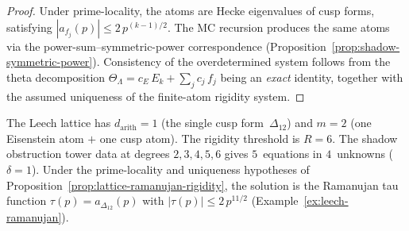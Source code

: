 \begin{proof}
Under prime-locality, the atoms are
Hecke eigenvalues of cusp forms, satisfying
$|a_{f_j}(p)| \leq 2\,p^{(k-1)/2}$. The MC recursion
produces the same atoms via the power-sum--symmetric-power
correspondence
(Proposition~\ref{prop:shadow-symmetric-power}). Consistency
of the overdetermined system follows from the theta decomposition
$\Theta_\Lambda = c_E\,E_k + \sum_j c_j\,f_j$ being an
\emph{exact} identity, together with the assumed uniqueness of the
finite-atom rigidity system.
\end{proof}

\begin{example}%
\label{ex:leech-rigidity}%
%
The Leech lattice has $d_{\mathrm{arith}} = 1$ (the single
cusp form~$\Delta_{12}$) and $m = 2$ (one Eisenstein atom $+$
one cusp atom). The rigidity threshold is $R = 6$. The
shadow obstruction tower data at degrees $2, 3, 4, 5, 6$ gives
$5$~equations in $4$~unknowns ($\delta = 1$). Under the
prime-locality and uniqueness hypotheses of
Proposition~\ref{prop:lattice-ramanujan-rigidity}, the solution is
the Ramanujan tau function
$\tau(p) = a_{\Delta_{12}}(p)$ with
$|\tau(p)| \leq 2\,p^{11/2}$
(Example~\ref{ex:leech-ramanujan}).
\end{example}


